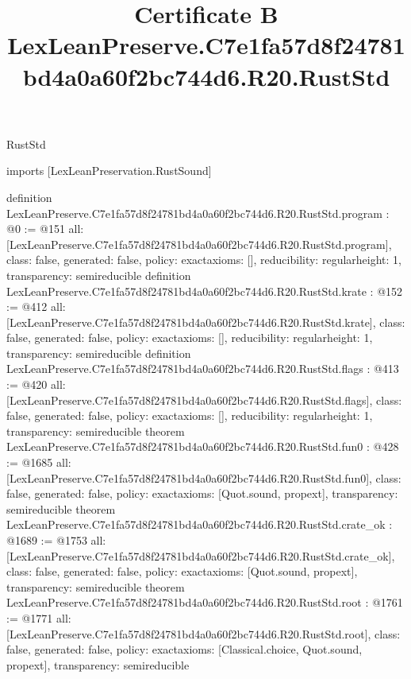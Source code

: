 \begin{lexlean}{RustStd}
\title{Certificate B LexLeanPreserve.C7e1fa57d8f24781bd4a0a60f2bc744d6.R20.RustStd}
\begin{coremodule}
imports [LexLeanPreservation.RustSound]

definition LexLeanPreserve.C7e1fa57d8f24781bd4a0a60f2bc744d6.R20.RustStd.program : @0 := @151 {
  all: [LexLeanPreserve.C7e1fa57d8f24781bd4a0a60f2bc744d6.R20.RustStd.program],
  class: false,
  generated: false,
  policy: exact{axioms: []},
  reducibility: regular{height: 1},
  transparency: semireducible
}
definition LexLeanPreserve.C7e1fa57d8f24781bd4a0a60f2bc744d6.R20.RustStd.krate : @152 := @412 {
  all: [LexLeanPreserve.C7e1fa57d8f24781bd4a0a60f2bc744d6.R20.RustStd.krate],
  class: false,
  generated: false,
  policy: exact{axioms: []},
  reducibility: regular{height: 1},
  transparency: semireducible
}
definition LexLeanPreserve.C7e1fa57d8f24781bd4a0a60f2bc744d6.R20.RustStd.flags : @413 := @420 {
  all: [LexLeanPreserve.C7e1fa57d8f24781bd4a0a60f2bc744d6.R20.RustStd.flags],
  class: false,
  generated: false,
  policy: exact{axioms: []},
  reducibility: regular{height: 1},
  transparency: semireducible
}
theorem LexLeanPreserve.C7e1fa57d8f24781bd4a0a60f2bc744d6.R20.RustStd.fun0 : @428 := @1685 {
  all: [LexLeanPreserve.C7e1fa57d8f24781bd4a0a60f2bc744d6.R20.RustStd.fun0],
  class: false,
  generated: false,
  policy: exact{axioms: [Quot.sound, propext]},
  transparency: semireducible
}
theorem LexLeanPreserve.C7e1fa57d8f24781bd4a0a60f2bc744d6.R20.RustStd.crate_ok : @1689 := @1753 {
  all: [LexLeanPreserve.C7e1fa57d8f24781bd4a0a60f2bc744d6.R20.RustStd.crate_ok],
  class: false,
  generated: false,
  policy: exact{axioms: [Quot.sound, propext]},
  transparency: semireducible
}
theorem LexLeanPreserve.C7e1fa57d8f24781bd4a0a60f2bc744d6.R20.RustStd.root : @1761 := @1771 {
  all: [LexLeanPreserve.C7e1fa57d8f24781bd4a0a60f2bc744d6.R20.RustStd.root],
  class: false,
  generated: false,
  policy: exact{axioms: [Classical.choice, Quot.sound, propext]},
  transparency: semireducible
}


\end{coremodule}
\end{lexlean}
